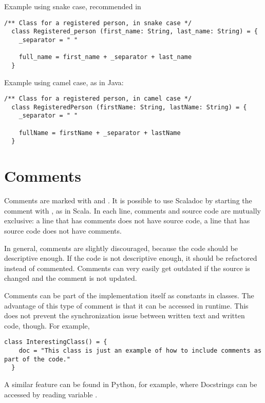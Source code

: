 Example using snake case, recommended in \Soda

\begin{lstlisting}[label={lst:exampleExtendsSnakeCase}]
  /** Class for a registered person, in snake case */
  class Registered_person (first_name: String, last_name: String) = {
    _separator = " "

    full_name = first_name + _separator + last_name
  }
\end{lstlisting}

Example using camel case, as in Java:
\begin{lstlisting}[label={lst:exampleExtendsCamelCase}]
  /** Class for a registered person, in camel case */
  class RegisteredPerson (firstName: String, lastName: String) = {
    _separator = " "

    fullName = firstName + _separator + lastName
  }
\end{lstlisting}


\section{Comments}

Comments are marked with \srccode{/*} and \srccode{*/}.
It is possible to use Scaladoc by starting the comment with \srccode{/**}, as in Scala.
In each line, comments and source code are mutually exclusive: a line that has comments does not have source code, a line that has source code does not have comments.

In general, comments are slightly discouraged, because the code should be descriptive enough. %
If the code is not descriptive enough, it should be refactored instead of commented.
Comments can very easily get outdated if the source is changed and the comment is not updated.

Comments can be part of the implementation itself as constants in classes.
The advantage of this type of comment is that it can be accessed in runtime.
This does not prevent the synchronization issue between written text and written code, though.
For example,

\begin{lstlisting}[label={lst:exampleClassWithComment}]
  class InterestingClass() = {
    doc = "This class is just an example of how to include comments as part of the code."
  }
\end{lstlisting}

A similar feature can be found in Python, for example, where Docstrings can be accessed by reading variable .

